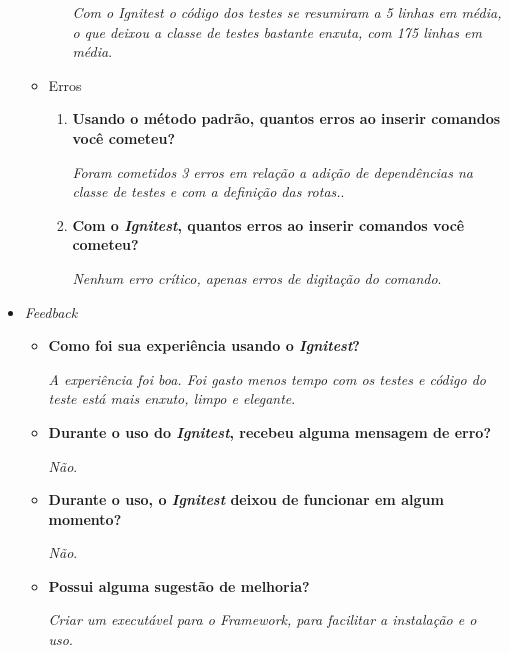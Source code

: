 \begin{itemize}
\begin{itemize}
\begin{enumerate}
			  \subitem \textit{Com o Ignitest o código dos testes se resumiram a 5 linhas em média, o que deixou a classe
				    de testes bastante enxuta, com 175 linhas em média}.
			  
                    \end{enumerate}

                \item Erros
                    \begin{enumerate}
                        \item \textbf{Usando o método padrão, quantos erros ao inserir comandos você cometeu?}
                        
			  \subitem \textit{Foram cometidos 3 erros em relação a adição de dependências na classe de testes e
				    com a definição das rotas.}.
			  
                        \item \textbf{Com o \textit{Ignitest}, quantos erros ao inserir comandos você cometeu?}
			  
			  \subitem \textit{Nenhum erro crítico, apenas erros de digitação do comando}.
                    \end{enumerate}
            \end{itemize}
        
        \item \textit{Feedback}
            \begin{itemize}
                \item \textbf{Como foi sua experiência usando o \textit{Ignitest}?}
		    
		   \subitem \textit{A experiência foi boa. Foi gasto menos tempo com os testes e código do teste está mais
			    enxuto, limpo e elegante}.
		  
                \item \textbf{Durante o uso do \textit{Ignitest}, recebeu alguma mensagem de erro?}
                
		   \subitem \textit{Não}.
		   
                \item \textbf{Durante o uso, o \textit{Ignitest} deixou de funcionar em algum momento?}
                
		   \subitem \textit{Não}.
		   
                \item \textbf{Possui alguma sugestão de melhoria?}
                
		   \subitem \textit{Criar um executável para o Framework, para facilitar a instalação e o uso}.
            \end{itemize}
    \end{itemize}